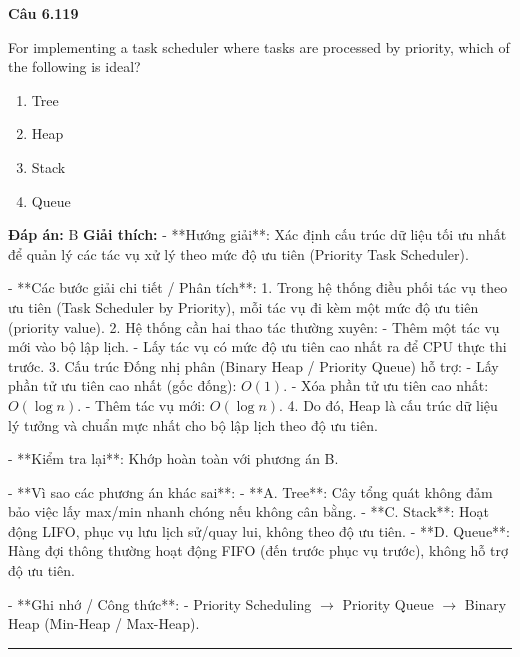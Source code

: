 \documentclass[11pt,a4paper]{article}
\newenvironment{question}[1]{%
  \par\vspace{1em}\noindent\textbf{\large Câu #1}\par\vspace{0.4em}
}{%
  \par\vspace{1em}\hrule\vspace{0.6em}
}
\newenvironment{choices}{%
  \begin{enumerate}[label=\textbf{\Alph*.},leftmargin=2.2em,itemsep=2pt,topsep=3pt]
}{%
  \end{enumerate}
}
\newcommand{\choice}{\item}
\begin{document}
\begin{question}{6.119}
For implementing a task scheduler where tasks are processed by priority, which of the following is ideal?
\begin{choices}
\choice Tree
\choice Heap
\choice Stack
\choice Queue
\end{choices}
\textbf{Đáp án:} B
\textbf{Giải thích:} - **Hướng giải**:
  Xác định cấu trúc dữ liệu tối ưu nhất để quản lý các tác vụ xử lý theo mức độ ưu tiên (Priority Task Scheduler).

- **Các bước giải chi tiết / Phân tích**:
  1. Trong hệ thống điều phối tác vụ theo ưu tiên (Task Scheduler by Priority), mỗi tác vụ đi kèm một mức độ ưu tiên (priority value).
  2. Hệ thống cần hai thao tác thường xuyên:
     - Thêm một tác vụ mới vào bộ lập lịch.
     - Lấy tác vụ có mức độ ưu tiên cao nhất ra để CPU thực thi trước.
  3. Cấu trúc Đống nhị phân (Binary Heap / Priority Queue) hỗ trợ:
     - Lấy phần tử ưu tiên cao nhất (gốc đống): \(O(1)\).
     - Xóa phần tử ưu tiên cao nhất: \(O(\log n)\).
     - Thêm tác vụ mới: \(O(\log n)\).
  4. Do đó, Heap là cấu trúc dữ liệu lý tưởng và chuẩn mực nhất cho bộ lập lịch theo độ ưu tiên.

- **Kiểm tra lại**:
  Khớp hoàn toàn với phương án B.

- **Vì sao các phương án khác sai**:
  - **A. Tree**: Cây tổng quát không đảm bảo việc lấy max/min nhanh chóng nếu không cân bằng.
  - **C. Stack**: Hoạt động LIFO, phục vụ lưu lịch sử/quay lui, không theo độ ưu tiên.
  - **D. Queue**: Hàng đợi thông thường hoạt động FIFO (đến trước phục vụ trước), không hỗ trợ độ ưu tiên.

- **Ghi nhớ / Công thức**:
  - Priority Scheduling \(\rightarrow\) Priority Queue \(\rightarrow\) Binary Heap (Min-Heap / Max-Heap).
\end{question}
\end{document}
